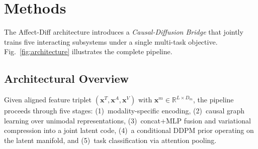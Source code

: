 \documentclass[conference]{IEEEtran}
\begin{document}
\section{Methods}
\label{sec:methods}

The Affect-Diff architecture introduces a \emph{Causal-Diffusion Bridge} that
jointly trains five interacting subsystems under a single multi-task objective.
Fig.~\ref{fig:architecture} illustrates the complete pipeline.

\subsection{Architectural Overview}

Given aligned feature triplet $(\mathbf{x}^T, \mathbf{x}^A, \mathbf{x}^V)$
with $\mathbf{x}^m \in \mathbb{R}^{L \times D_m}$, the pipeline proceeds
through five stages: (1)~modality-specific encoding, (2)~causal graph learning
over unimodal representations, (3)~concat+MLP fusion and variational compression
into a joint latent code, (4)~a conditional DDPM prior operating on the latent
manifold, and (5)~task classification via attention pooling.
\end{document}
